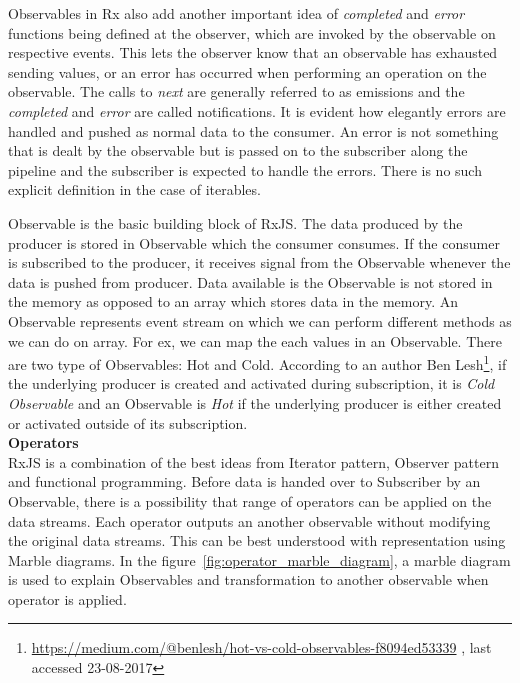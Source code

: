 Observables in Rx also add another important idea of \textit{completed} and \textit{error} functions being defined at the observer, which are invoked by the observable on respective events. This lets the observer know that an observable has exhausted sending values, or an error has occurred when performing an operation on the observable. The calls to \textit{next} are generally referred to as emissions and the \textit{completed} and \textit{error} are called notifications. It is evident how elegantly errors are handled and pushed as normal data to the consumer. An error is not something that is dealt by the observable but is passed on to the subscriber along the pipeline and the subscriber is expected to handle the errors. There is no such explicit definition in the case of iterables.  

Observable is the basic building block of RxJS. The data produced by the producer is stored in Observable which the consumer consumes. If the consumer is subscribed to the producer, it receives signal from the Observable whenever the data is pushed from producer. Data available is the Observable is not stored in the memory as opposed to an array which stores data in the memory. An Observable represents event stream on which we can perform different methods as we can do on array. For ex, we can map the each values in an Observable. There are two type of Observables: Hot and Cold. According to an author Ben Lesh\footnote{\url{https://medium.com/@benlesh/hot-vs-cold-observables-f8094ed53339} , last accessed 23-08-2017}, if the underlying producer is created and activated during subscription, it is \textit{Cold Observable} and an Observable is \textit{Hot} if the underlying producer is either created or activated outside of its subscription.
\\
\textbf{Operators}
\\
RxJS is a combination of the best ideas from Iterator pattern, Observer pattern and functional programming\cite{reactiveX}. Before data is handed over to Subscriber by an Observable, there is a possibility that range of operators can be applied on the data streams. Each operator outputs an another observable without modifying the original data streams. This can be best understood with representation using Marble diagrams. In the figure~\ref{fig:operator_marble_diagram},  a marble diagram is used to explain Observables and transformation to another observable when operator is applied. 

